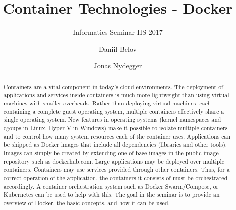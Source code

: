 \documentclass[sigconf]{acmart}
\begin{document}
\title{Container Technologies - Docker}
\subtitle{Informatics Seminar HS 2017}

\author{Daniil Belov}

\author{Jonas Nydegger}

\begin{abstract}
	Containers are a vital component in today's cloud environments. 
	The deployment of applications and services inside containers is much more lightweight than using virtual machines with smaller overheads.
	Rather than deploying virtual machines, each containing a complete guest operating system, multiple containers effectively share a single operating system. 
	New features in operating systems (kernel namespaces and cgoups in Linux, Hyper-V in Windows)
	make it possible to isolate multiple containers and to control how many system resources each of the container uses.
	Applications can be shipped as Docker images that include all dependencies (libraries and other tools). 
	Images can simply be created by extending one of base images in the public image repository such as dockerhub.com.
	Large applications may be deployed over multiple containers. Containers may use services provided through other containers. 
	Thus, for a correct operation of the application, the containers it consists of must be orchestrated accordingly. 
	A container orchestration system such as Docker Swarm/Compose, or Kubernetes can be used to help with this.
	The goal in the seminar is to provide an overview of Docker, the basic concepts, and how it can be used.
\end{abstract}
\end{document}
